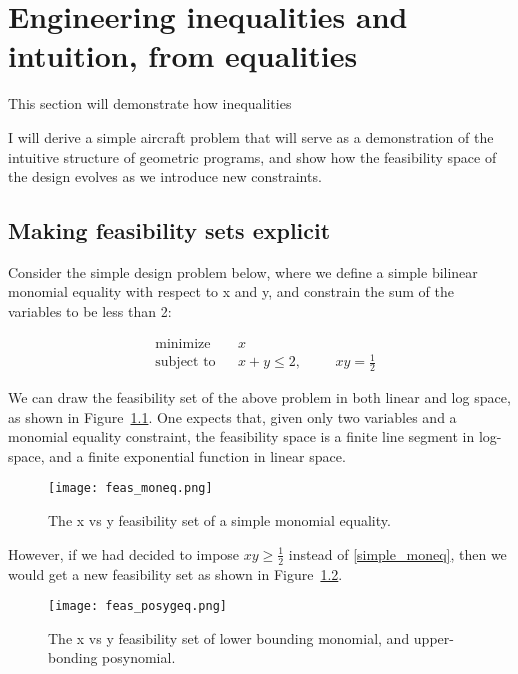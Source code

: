 \chapter{Engineering inequalities and intuition, from equalities}
\label{ch2:inequalities}

This section will demonstrate how inequalities

I will derive a simple aircraft problem that will serve as
a demonstration of the intuitive structure of geometric programs, and show
how the feasibility space of the design evolves as we introduce new constraints.

\section{Making feasibility sets explicit}

Consider the simple design problem below, where we define a simple bilinear
monomial equality with respect to x and y, and constrain the sum of the variables
to be less than 2:

\begin{equation*}
\begin{aligned}
& {\text{minimize}}
& & x \\
& \text{subject to}
& & x + y \leq 2,
    & & & xy = \frac{1}{2} \label{simple_moneq}
\end{aligned}
\end{equation*}

We can draw the feasibility set of the above problem in both linear and log space,
as shown in Figure~\ref{f:feas_moneq}. One expects that, given only two variables
and a monomial equality constraint, the feasibility space is
a finite line segment in log-space, and a finite exponential function in linear space.

\begin{figure}
    \centering
    \texttt{[image: feas\_moneq.png]}
    \caption{The x vs y feasibility set of a simple monomial equality.}
    \label{f:feas_moneq}
\end{figure}

However, if we had decided to impose $xy \geq \frac{1}{2}$ instead of \ref{simple_moneq},
then we would get a new feasibility set as shown in Figure~\ref{f:feas_posygeq}.

\begin{figure}
    \centering
    \texttt{[image: feas\_posygeq.png]}
    \caption{The x vs y feasibility set of lower bounding monomial,
    and upper-bonding posynomial.}
    \label{f:feas_posygeq}
\end{figure}

